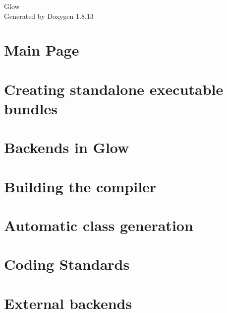 \documentclass[twoside]{book}
\newcommand{\+}{\discretionary{\mbox{\scriptsize$\hookleftarrow$}}{}{}}
\newcommand{\clearemptydoublepage}{%
  \newpage{\pagestyle{empty}\cleardoublepage}%
}
\begin{document}
\hypersetup{pageanchor=false,
             bookmarksnumbered=true,
             pdfencoding=unicode
            }
\begin{titlepage}
\vspace*{7cm}
\begin{center}%
{\Large Glow }\\
\vspace*{1cm}
{\large Generated by Doxygen 1.8.13}\\
\end{center}
\end{titlepage}
\clearemptydoublepage
{}
\tableofcontents
\clearemptydoublepage
{}
\hypersetup{pageanchor=true}

\chapter{Main Page}
\label{index}\hypertarget{index}{}
\chapter{Creating standalone executable bundles}
\label{md_docs__a_o_t}

\chapter{Backends in Glow}
\label{md_docs__backends}

\chapter{Building the compiler}
\label{md_docs__building}

\chapter{Automatic class generation}
\label{md_docs__class_gen}

\chapter{Coding Standards}
\label{md_docs__coding_standards}

\chapter{External backends}
\label{md_docs__external_backend}

\end{document}
